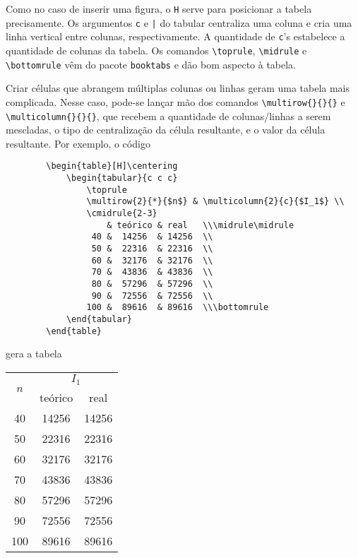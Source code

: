        Como no caso de inserir uma figura, o {\tt H} serve para posicionar a tabela precisamente.
        Os argumentos {\tt c} e {\tt |} do tabular centraliza uma coluna e cria uma linha vertical entre colunas, respectivamente.
        A quantidade de {\tt c}'s estabelece a quantidade de colunas da tabela.
        Os comandos \verb|\toprule|, \verb|\midrule| e \verb|\bottomrule| vêm do pacote {\tt booktabs}
        e dão bom aspecto à tabela.

        Criar células que abrangem múltiplas colunas ou linhas geram uma tabela mais complicada.
        Nesse caso, pode-se lançar mão dos comandos \verb|\multirow{}{}{}| e \verb|\multicolumn{}{}{}|,
        que recebem a quantidade de colunas/linhas a serem mescladas, 
        o tipo de centralização da célula resultante,
        e o valor da célula resultante.
        Por exemplo, o código
        \begin{verbatim}
        \begin{table}[H]\centering
            \begin{tabular}{c c c}
                \toprule
                \multirow{2}{*}{$n$} & \multicolumn{2}{c}{$I_1$} \\
                \cmidrule{2-3}
                    & teórico & real   \\\midrule\midrule
                 40 &  14256  & 14256  \\
                 50 &  22316  & 22316  \\
                 60 &  32176  & 32176  \\
                 70 &  43836  & 43836  \\
                 80 &  57296  & 57296  \\
                 90 &  72556  & 72556  \\
                100 &  89616  & 89616  \\\bottomrule
            \end{tabular}
        \end{table}
        \end{verbatim}

        gera a tabela
        \begin{table}[H]\centering
            \begin{tabular}{c c c}
                \toprule
                \multirow{2}{*}{$n$} & \multicolumn{2}{c}{$I_1$} \\
                \cmidrule{2-3}
                    & teórico & real   \\\midrule\midrule
                 40 &  14256  & 14256  \\
                 50 &  22316  & 22316  \\
                 60 &  32176  & 32176  \\
                 70 &  43836  & 43836  \\
                 80 &  57296  & 57296  \\
                 90 &  72556  & 72556  \\
                100 &  89616  & 89616  \\\bottomrule
            \end{tabular}
        \end{table}


